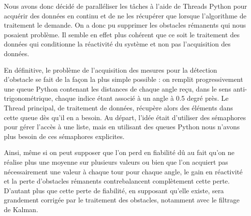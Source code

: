\tab Nous avons donc décidé de paralléliser les tâches à l’aide de Threads Python pour acquérir des données en continu et de ne les récupérer que lorsque l’algorithme de traitement le demande. On a donc pu supprimer les obstacles rémanents qui nous posaient problème. Il semble en effet plus cohérent que ce soit le traitement des données qui conditionne la réactivité du système et non pas l'acquisition des données. 

\tab En définitive, le problème de l'acquisition des mesures pour la détection d'obstacle se fait de la façon la plus simple possible : on remplit progressivement une queue Python contenant les distances de chaque angle reçu, dans le sens anti-trigonométrique, chaque indice étant associé à un angle à 0.5 degré près. Le Thread principal, de traitement de données, récupère alors des éléments dans cette queue dès qu'il en a besoin. Au départ, l'idée était d'utiliser des sémaphores pour gérer l'accès à une liste, mais en utilisant des queues Python nous n'avons plus besoin de ces sémaphores explicites.

\tab Ainsi, même si on peut supposer que l'on perd en fiabilité dû au fait qu'on ne réalise plus une moyenne sur plusieurs valeurs ou bien que l'on acquiert pas nécessairement une valeur à chaque tour pour chaque angle, le gain en réactivité et la perte d'obstacles rémanents contrebalancent complètement cette perte. D'autant plus que cette perte de fiabilité, en supposant qu'elle existe, sera grandement corrigée par le traitement des obstacles, notamment avec le filtrage de Kalman.

